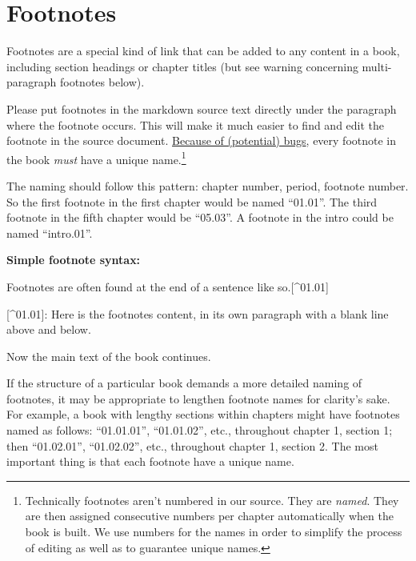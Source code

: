 \documentclass[
]{book}
\newenvironment{Shaded}{\begin{snugshade}}{\end{snugshade}}
\newcommand{\NormalTok}[1]{#1}
\newcommand{\OtherTok}[1]{\textcolor[rgb]{0.56,0.35,0.01}{#1}}
\begin{document}
\hypertarget{footnotes}{%
\section{Footnotes}\label{footnotes}}

Footnotes are a special kind of link that can be added to any content in a book, including section headings or chapter titles (but see warning concerning multi-paragraph footnotes below).

Please put footnotes in the markdown source text directly under the paragraph where the footnote occurs. This will make it much easier to find and edit the footnote in the source document. \href{https://community.rstudio.com/t/how-can-i-enable-the-file-scope-option/83741}{Because of (potential) bugs}, every footnote in the book \emph{must} have a unique name.\footnote{Technically footnotes aren't numbered in our source. They are \emph{named}. They are then assigned consecutive numbers per chapter automatically when the book is built. We use numbers for the names in order to simplify the process of editing as well as to guarantee unique names.}

The naming should follow this pattern: chapter number, period, footnote number. So the first footnote in the first chapter would be named ``01.01''. The third footnote in the fifth chapter would be ``05.03''. A footnote in the intro could be named ``intro.01''.

\textbf{Simple footnote syntax:}

\begin{Shaded}
\begin{Highlighting}[]
\NormalTok{Footnotes are often found at the end of a sentence like so.}\OtherTok{[\^{}01.01]}

\OtherTok{[\^{}01.01]: }\NormalTok{Here is the footnote\textquotesingle{}s content, in its own paragraph with a blank line above and below.}

\NormalTok{Now the main text of the book continues.}
\end{Highlighting}
\end{Shaded}

If the structure of a particular book demands a more detailed naming of footnotes, it may be appropriate to lengthen footnote names for clarity's sake. For example, a book with lengthy sections within chapters might have footnotes named as follows: ``01.01.01'', ``01.01.02'', etc., throughout chapter 1, section 1; then ``01.02.01'', ``01.02.02'', etc., throughout chapter 1, section 2. The most important thing is that each footnote have a unique name.
\end{document}
